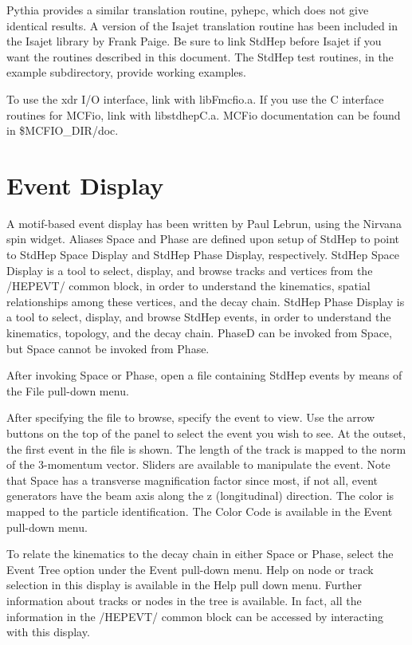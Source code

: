 Pythia provides a similar translation routine, pyhepc, 
which does not give identical results.
A version of the Isajet translation routine has been included in the Isajet 
library by Frank Paige.  Be sure to link StdHep before Isajet if you want
the routines described in this document.
The StdHep test routines, in the example subdirectory, 
provide working examples.

To use the xdr I/O interface, link with libFmcfio.a.
If you use the C interface routines for MCFio, link with libstdhepC.a.
MCFio documentation can be found in \$MCFIO\_DIR/doc.

\section { Event Display}

A motif-based event display has been written by Paul Lebrun, using
the Nirvana spin widget.
Aliases Space and Phase are defined
upon setup of StdHep to point to StdHep Space Display and StdHep Phase
Display, respectively.
StdHep Space Display is a tool to select, display, and browse 
tracks and vertices from the /HEPEVT/ common block, 
in order to understand the kinematics, 
spatial relationships among these vertices, and the decay chain.
StdHep Phase Display is a tool to select, display, and browse StdHep events, 
in order to understand the kinematics, topology, and the decay chain.
PhaseD can be invoked from Space, but Space cannot be invoked from Phase.

After invoking Space or Phase, open a 
file containing StdHep events by means of the File pull-down menu.  

After specifying the file to browse, specify the event to view.
Use the arrow buttons on the top of the panel to select the event you 
wish to see. 
At the outset, the first event in the file is shown.
The length of the track is mapped to the norm of the 3-momentum vector.  
Sliders are available to manipulate the event.
Note that Space has a transverse magnification factor 
since most, if not all, event generators have the beam axis along the z
(longitudinal) direction.
The color is mapped to the particle identification. 
The Color Code is available in the Event pull-down menu. 

To relate the kinematics to the decay chain in either Space or Phase, 
select the Event Tree option under the Event pull-down menu.
Help on node or track selection in this display is available 
in the Help pull down menu.  
Further information about tracks or nodes in the tree is available. 
In fact, all the information in the /HEPEVT/ common block
can be accessed by interacting with this display.
    
